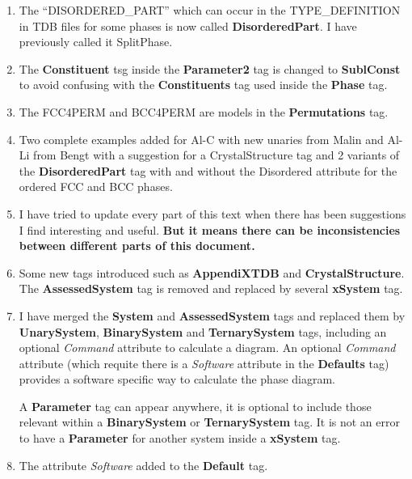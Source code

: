 \documentclass{article}
\begin{document}
\begin{enumerate}
\item The ``DISORDERED\_PART'' which can occur in the TYPE\_DEFINITION
  in TDB files for some phases is now called {\bf DisorderedPart}.  I
  have previously called it SplitPhase.

\item The {\bf Constituent} tsg inside the {\bf Parameter2} tag is
  changed to {\bf SublConst} to avoid confusing with the {\bf
    Constituents} tag used inside the {\bf Phase} tag.

\item The FCC4PERM and BCC4PERM are models in the {\bf Permutations}
  tag.

\item Two complete examples added for Al-C with new unaries from Malin
  and Al-Li from Bengt with a suggestion for a CrystalStructure tag
  and 2 variants of the {\bf DisorderedPart} tag with and without the
  {\rm Disordered} attribute for the ordered FCC and BCC phases.

\item I have tried to update every part of this text when there has
  been suggestions I find interesting and useful. {\bf But it means
    there can be inconsistencies between different parts of this
    document.}

\item Some new tags introduced such as {\bf AppendiXTDB} and {\bf
  CrystalStructure}.  The {\bf AssessedSystem} tag is removed and
  replaced by several {\bf xSystem} tag.

\item I have merged the {\bf System} and {\bf AssessedSystem} tags and
  replaced them by {\bf UnarySystem}, {\bf BinarySystem} and {\bf
    TernarySystem} tags, including an optional {\em Command} attribute
  to calculate a diagram.  An optional {\em Command} attribute (which
  requite there is a {\em Software} attribute in the {\bf Defaults}
  tag) provides a software specific way to calculate the phase
  diagram.

  A {\bf Parameter} tag can appear anywhere, it is optional to include
  those relevant within a {\bf BinarySystem} or {\bf TernarySystem}
  tag.  It is not an error to have a {\bf Parameter} for another
  system inside a {\bf xSystem} tag.

\item The attribute {\em Software} added to the {\bf Default} tag.
  
\end{enumerate}
\end{document}
